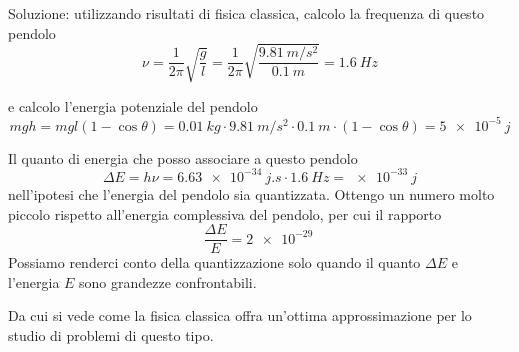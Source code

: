 Soluzione:
utilizzando risultati di fisica classica, calcolo la frequenza di questo pendolo
\begin{equation}
\nu = \frac{ 1}{2\pi } \sqrt{\frac{ g}{l }} = \frac{ 1}{2\pi }\sqrt{\frac{ \SI{9.81}{m/s^2}}{\SI{0.1}{m} }} = \SI{1.6}{Hz}
\end{equation}

e calcolo l'energia potenziale del pendolo
\begin{equation}
mgh = mgl(1-\cos \theta) = \SI{0.01}{kg} \cdot \SI{9.81}{m/s^2} \cdot \SI{0.1}{m} \cdot (1-\cos \theta) = \SI{5e-5}{j}
\end{equation}

Il quanto di energia che posso associare a questo pendolo 
\begin{equation}
\Delta E = h\nu = \SI{6.63e-34}{j.s} \cdot \SI{1.6}{Hz} = \SI{e-33}{j}
\end{equation}
nell'ipotesi che l'energia del pendolo sia quantizzata.
Ottengo un numero molto piccolo rispetto all'energia complessiva del pendolo, per cui il rapporto
\begin{equation}
\frac{ \Delta E }{E } = \SI{2e-29}{}
\end{equation}
Possiamo renderci conto della quantizzazione solo quando il quanto $\Delta E$ e l'energia $E$ sono grandezze confrontabili.

Da cui si vede come la fisica classica offra un'ottima approssimazione per lo studio di problemi di questo tipo.


